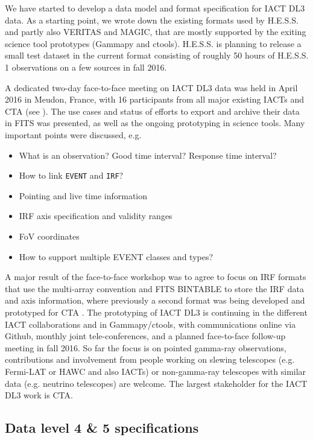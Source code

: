 We have started to develop a data model and format specification for IACT DL3 data. As a starting point, we wrote down the existing formats used by H.E.S.S. and partly also VERITAS and MAGIC, that are mostly supported by the exiting science tool prototypes (Gammapy and ctools). H.E.S.S. is planning to release a small test dataset in the current format consisting of roughly 50 hours of H.E.S.S. 1 observations on a few sources in fall 2016.

A dedicated two-day face-to-face meeting on IACT DL3 data was held in April 2016 in Meudon, France, with 16 participants from all major existing IACTs and CTA (see \ogrameudon). The use cases and status of efforts to export and archive their data in FITS was presented, as well as the ongoing prototyping in science tools. Many important points were discussed, e.g.

\begin{itemize}
\item{}What is an observation? Good time interval? Response time interval?
\item{}How to link \texttt{EVENT} and \texttt{IRF}?
\item{}Pointing and live time information
\item{}IRF axis specification and validity ranges
\item{}FoV coordinates
\item{}How to support multiple EVENT classes and types?
\end{itemize}

A major result of the face-to-face workshop was to agree to focus on IRF formats that use the multi-array convention and FITS BINTABLE to store the IRF data and axis information, where previously a second format was being developed and prototyped for CTA \citep{2015arXiv150807437W}. The prototyping of IACT DL3 is continuing in the different IACT collaborations and in Gammapy/ctools, with communications online via Github, monthly joint tele-conferences, and a planned face-to-face follow-up meeting in fall 2016. So far the focus is on pointed gamma-ray observations, contributions and involvement from people working on slewing telescopes (e.g. Fermi-LAT or HAWC and also IACTs) or non-gamma-ray telescopes with similar data (e.g. neutrino telescopes) are welcome. The largest stakeholder for the IACT DL3 work is CTA.

\subsection{Data level 4 \& 5 specifications}

